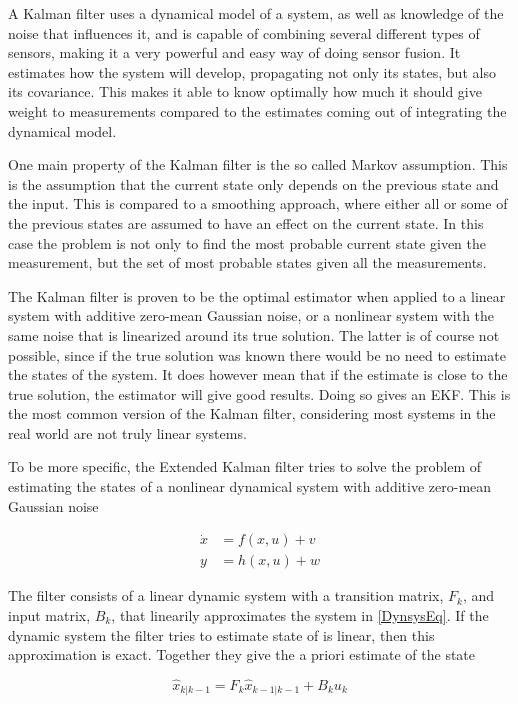 A Kalman filter uses a dynamical model of a system, as well as knowledge of the noise that influences it, and is capable of combining several different types of sensors, making it a very powerful and easy way of doing sensor fusion. It estimates how the system will develop, propagating not only its states, but also its covariance. This makes it able to know optimally how much it should give weight to measurements compared to the estimates coming out of integrating the dynamical model. 

One main property of the Kalman filter is the so called Markov assumption. This is the assumption that the current state only depends on the previous state and the input. This is compared to a smoothing approach, where either all or some of the previous states are assumed to have an effect on the current state. In this case the problem is not only to find the most probable current state given the measurement, but the set of most probable states given all the measurements. 

The Kalman filter is proven to be the optimal estimator when applied to a linear system with additive zero-mean Gaussian noise, or a nonlinear system with the same noise that is linearized around its true solution. The latter is of course not possible, since if the true solution was known there would be no need to estimate the states of the system. It does however mean that if the estimate is close to the true solution, the estimator will give good results. Doing so gives an \gls{EKF}\cite{EKF}. This is the most common version of the Kalman filter, considering most systems in the real world are not truly linear systems.  

To be more specific, the Extended Kalman filter tries to solve the problem of estimating the states of a nonlinear dynamical system with additive zero-mean Gaussian noise 

\begin{align}
    \Dot{x} &= f(x,u) + v \\
    y &= h(x,u) + w
    \label{DynsysEq}
\end{align}

The filter consists of a linear dynamic system with a transition matrix, $F_{k}$, and input matrix, $B_k$, that linearily approximates the system in \ref{DynsysEq}. If the dynamic system the filter tries to estimate state of is linear, then this approximation is exact. Together they give the a priori estimate of the state

\begin{equation}
    \hat{x}_{k|k-1} = F_k\hat{x}_{k-1|k-1} + B_k u_k
\end{equation}

